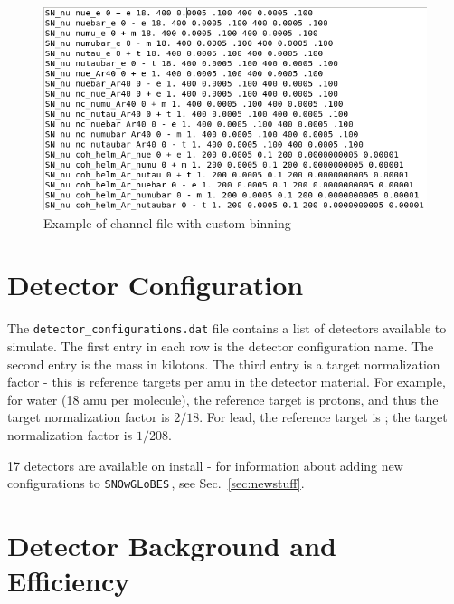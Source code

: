 \documentclass{article}
\newcommand{\snow}{\texttt{SNOwGLoBES}\,}
\begin{document}
\begin{figure}[h!]
\centering
\includegraphics[scale=.4]{figures/newSNOWGLOBESchannelfile.png}
\caption{Example of channel file with custom binning}
\label{fig:newsnowchanfile}
\end{figure}

\section{Detector Configuration} \label{sec:det.config}

The \texttt{detector\_configurations.dat} file contains a list of detectors available to simulate.  The first entry in each row is the detector configuration name. The second entry is the mass in kilotons. The third entry is a target normalization factor - this is
reference targets per amu in the detector material. For example, for water (18 amu per molecule), the reference target is protons, and thus the target normalization factor is $2/18$. For lead, the reference target is ; the target normalization factor is $1/208$.

17 detectors are available on install - for information about adding new configurations to \snow, see Sec.~\ref{sec:newstuff}.

\section{Detector Background and Efficiency}\label{sec:bkg&effic}
\end{document}
